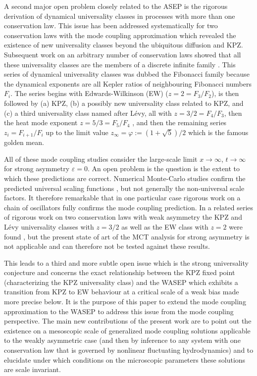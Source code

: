 \documentclass[12pt]{article}
\begin{document}
A second major open problem closely related to the ASEP is the 
rigorous derivation of dynamical universality classes in processes with 
more than one conservation law. This issue has been addressed 
systematically for two conservation laws with the mode coupling 
approximation \cite{Spoh14,Popk15a,Spoh15} which revealed the 
existence of new universality classes beyond the ubiquitous diffusion 
and KPZ. Subsequent work on an arbitrary number of conservation 
laws showed that all these universality classes are the members of a 
discrete infinite family \cite{Popk15b}. This series of dynamical
universality classes was dubbed the Fibonacci family because the 
dynamical exponents are all Kepler ratios of neighbouring Fibonacci 
numbers $F_i$. The series begins with Edwards-Wilkinson (EW)
($z=2=F_3/F_2$), is then followed by (a) KPZ, (b) a possibly new 
universality class related to KPZ, and (c) a third universality class 
named after L\'evy, all with $z=3/2=F_4/F_3$, then the heat 
mode exponent $z=5/3=F_5/F_4$ \cite{vanB12}, and then the 
remaining series $z_i=F_{i+1}/F_{i}$ up to the limit value 
$z_{\infty}=\varphi:=(1+\sqrt{5})/2$ which is the famous golden 
mean. 

All of these mode coupling studies consider the large-scale limit 
$x\to\infty$, $t\to\infty$ for strong asymmetry $\varepsilon=0$. 
An open problem is the question is the extent to which these
predictions are correct. Numerical Monte-Carlo studies confirm the 
predicted universal scaling functions \cite{Popk15b}, but not 
generally the non-universal scale factors. It therefore remarkable
that in one particular case rigorous work on a chain of oscillators
\cite{Bern12,Bern16} fully confirms the mode coupling prediction.
In a related series of rigorous work on two conservation laws
with weak asymmetry the KPZ and L\'evy universality classes with
$z=3/2$ as well as the  EW class with $z=2$ were found 
\cite{Bern14,Bern18,Ahme22}, but the present state of art of
the MCT analysis for strong asymmetry is not applicable and can 
therefore not be tested against these results.

This leads to a third and more subtle open issue which is the strong 
universality conjecture and concerns the exact relationship between 
the KPZ fixed point (characterizing the KPZ universality class) and the 
WASEP which exhibits a transition from KPZ to EW behaviour at a 
critical scale of a weak bias \cite{Gonc12} made more precise below. 
It is the purpose of this paper to extend the mode coupling 
approximation to the WASEP to address this issue from the mode 
coupling perspective. The main new contributions of the present work 
are to point out the existence on a mesoscopic scale of generalized 
mode coupling solutions applicable to the weakly asymmetric case 
(and then by inference to any system with one conservation law that is 
governed by nonlinear fluctuating hydrodynamics) and to elucidate 
under which conditions on the microscopic parameters these solutions 
are scale invariant.
\end{document}
